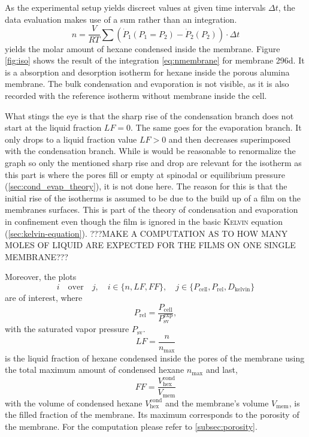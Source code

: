 \documentclass[../thesis.tex]{subfiles}
\begin{document}
          As the experimental setup yields discreet values at given time intervals $\Delta t$, the data evaluation makes use of a sum rather than an integration.
          \begin{equation}
              n = \frac{V}{RT} \sum \left( \dot{P}_1 ( P_1 = P_2) - \dot{P}_2(P_2) \right) \cdot \Delta t
              \label{eq:nmembrane}
          \end{equation}
          yields the molar amount of hexane condensed inside the membrane. Figure \cref{fig:iso} shows the result of the integration \cref{eq:nmembrane} for membrane 296d. It is a absorption and desorption isotherm for hexane inside the porous alumina membrane. The bulk condensation and evaporation is not visible, as it is also recorded with the reference isotherm without membrane inside the cell.

          What stings the eye is that the sharp rise of the condensation branch does not start at the liquid fraction $LF=0$. The same goes for the evaporation branch. It only drops to a liquid fraction value $LF>0$ and then decreases superimposed with the condensation branch. While is would be reasonable to renormalize the graph so only the mentioned sharp rise and drop are relevant for the isotherm as this part is where the pores fill or empty at spinodal or equilibrium pressure (\cref{sec:cond_evap_theory}), it is not done here. The reason for this is that the initial rise of the isotherms is assumed to be due to the build up of a film on the membranes surfaces. This is part of the theory of condensation and evaporation in confinement even though the film is ignored in the basic \textsc{Kelvin} equation (\cref{sec:kelvin-equation}). ???MAKE A COMPUTATION AS TO HOW MANY MOLES OF LIQUID ARE EXPECTED FOR THE FILMS ON ONE SINGLE MEMBRANE???
          \medskip

          Moreover, the plots
          \begin{equation}
              i \quad \mathrm{over} \quad j,\quad i\in \{n,LF,FF\}, \quad j\in \{P_\mathrm{cell},P_\mathrm{rel},D_\mathrm{kelvin}\}
          \end{equation}
          are of interest, where
          \begin{equation}
              P_\mathrm{rel} = \frac{P_\mathrm{cell}}{P_\mathrm{sv}^\mathrm{exp}},
          \end{equation}
          with the saturated vapor pressure $P_\mathrm{sv}$.
          \begin{equation}
              LF = \frac{n}{n_\mathrm{max}}
          \end{equation}
          is the liquid fraction of hexane condensed inside the pores of the membrane using the total maximum amount of condensed hexane $n_\mathrm{max}$ and last,
          \begin{equation}
              FF = \frac{V_\mathrm{hex}^\mathrm{cond}}{V_\mathrm{mem}}
          \end{equation}
          with the volume of condensed hexane $V_\mathrm{hex}^\mathrm{cond}$ and the membrane's volume $V_\mathrm{mem}$, is the filled fraction of the membrane. Its maximum corresponds to the porosity of the membrane. For the computation please refer to \cref{subsec:porosity}.
\end{document}
